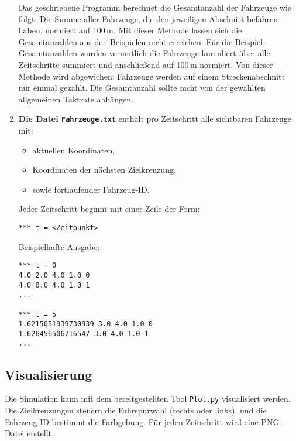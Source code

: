 \begin{enumerate}
Das geschriebene Programm berechnet die Gesamtanzahl der Fahrzeuge wie folgt: 
Die Summe aller Fahrzeuge, die den jeweiligen Abschnitt befahren haben, normiert auf 100\,m. 
Mit dieser Methode lassen sich die Gesamtanzahlen aus den Beispielen nicht erreichen. 
Für die Beispiel-Gesamtanzahlen wurden vermutlich die Fahrzeuge kumuliert über alle Zeitschritte summiert und 
anschließend auf 100\,m normiert. 
Von dieser Methode wird abgewichen: Fahrzeuge werden auf einem Streckenabschnitt nur einmal gezählt. 
Die Gesamtanzahl sollte nicht von der gewählten allgemeinen Taktrate abhängen.

\clearpage

  \item \textbf{Die Datei \texttt{Fahrzeuge.txt}} enthält pro Zeitschritt alle sichtbaren Fahrzeuge mit:
  \begin{itemize}
    \item aktuellen Koordinaten,
    \item Koordinaten der nächsten Zielkreuzung,
    \item sowie fortlaufender Fahrzeug-ID.
  \end{itemize}

  Jeder Zeitschritt beginnt mit einer Zeile der Form:

  \begin{verbatim}
*** t = <Zeitpunkt>
  \end{verbatim}

  Beispielhafte Ausgabe:

  \begin{verbatim}
*** t = 0
4.0 2.0 4.0 1.0 0
4.0 0.0 4.0 1.0 1
...

*** t = 5
1.6215051939730939 3.0 4.0 1.0 0
1.626456506716547 3.0 4.0 1.0 1
...
  \end{verbatim}
\end{enumerate}

\subsection*{Visualisierung}

Die Simulation kann mit dem bereitgestellten Tool \texttt{Plot.py} visualisiert werden. Die Zielkreuzungen steuern die Fahrspurwahl (rechts oder links), und die Fahrzeug-ID bestimmt die Farbgebung.
Für jeden Zeitschritt wird eine PNG-Datei erstellt.


